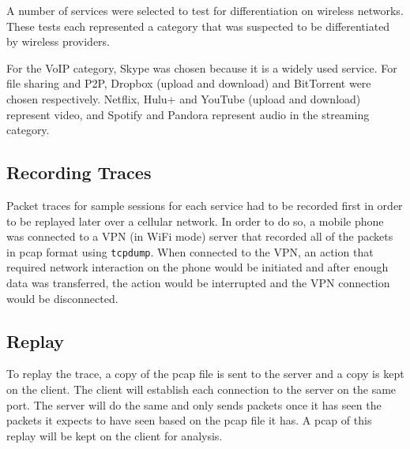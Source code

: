 \documentclass[letterpaper]{sig-alternate-10pt}
\begin{document}
A number of services were selected to test for differentiation on wireless networks. These tests each represented a category that was suspected to be differentiated by wireless providers.

For the VoIP category, Skype was chosen because it is a widely used service. For file sharing and P2P, Dropbox (upload and download) and BitTorrent were chosen respectively. Netflix, Hulu+ and YouTube (upload and download) represent video, and Spotify and Pandora represent audio in the streaming category.
\subsection{Recording Traces}

Packet traces for sample sessions for each service had to be recorded first in order to be replayed later over a cellular network. In order to do so, a mobile phone was connected to a VPN (in WiFi mode) server that recorded all of the packets in pcap format using \texttt{tcpdump}. When connected to the VPN, an action that required network interaction on the phone would be initiated and after enough data was transferred, the action would be interrupted and the VPN connection would be disconnected.



\subsection{Replay}

To replay the trace, a copy of the pcap file is sent to the server and a copy is kept on the client. The client will establish each connection to the server on the same port. The server will do the same and only sends packets once it has seen the packets it expects to have seen based on the pcap file it has. A pcap of this replay will be kept on the client for analysis.
\end{document}
